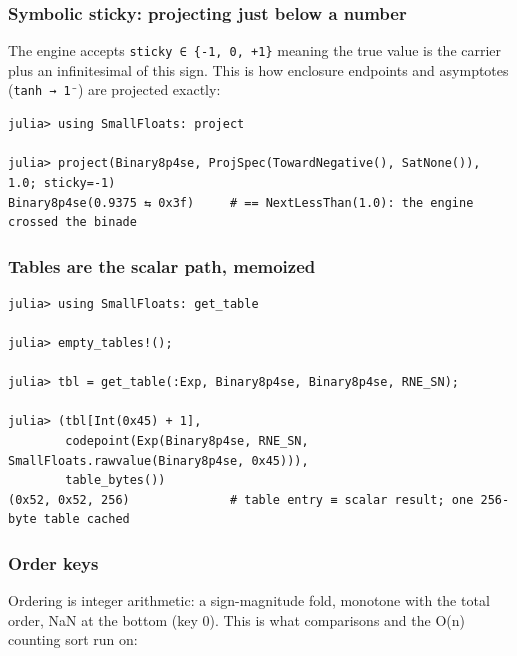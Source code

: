 \subsubsection{Symbolic sticky: projecting just below a number}



\label{4219032227185074744}{}


The engine accepts \texttt{sticky ∈ \{-1, 0, +1\}} meaning {\textquotedbl}the true value is the carrier plus an infinitesimal of this sign{\textquotedbl}. This is how enclosure endpoints and asymptotes (\texttt{tanh → 1⁻}) are projected exactly:




\nopagebreak[4]
\begin{verbatim}
julia> using SmallFloats: project

julia> project(Binary8p4se, ProjSpec(TowardNegative(), SatNone()), 1.0; sticky=-1)
Binary8p4se(0.9375 ⇆ 0x3f)     # == NextLessThan(1.0): the engine crossed the binade
\end{verbatim}



\subsubsection{Tables are the scalar path, memoized}



\label{17860062526638989794}{}



\begin{verbatim}
julia> using SmallFloats: get_table

julia> empty_tables!();

julia> tbl = get_table(:Exp, Binary8p4se, Binary8p4se, RNE_SN);

julia> (tbl[Int(0x45) + 1],
        codepoint(Exp(Binary8p4se, RNE_SN, SmallFloats.rawvalue(Binary8p4se, 0x45))),
        table_bytes())
(0x52, 0x52, 256)              # table entry ≡ scalar result; one 256-byte table cached
\end{verbatim}



\subsubsection{Order keys}



\label{11135872524320346846}{}


Ordering is integer arithmetic: a sign-magnitude fold, monotone with the total order, NaN at the bottom (key 0). This is what comparisons and the O(n) counting sort run on:




